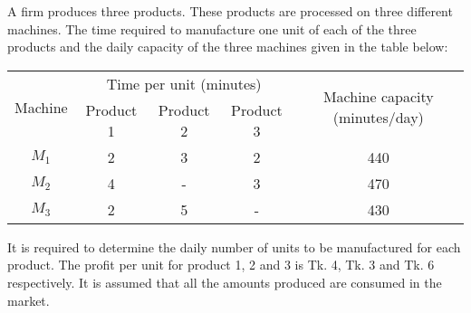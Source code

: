 \documentclass[../main-sheet.tex]{subfiles}
\begin{document}
\begin{ex}
    A firm produces three products. These products are processed on three different machines. The time required to manufacture one unit of each of the three products and the daily capacity of the three machines given in the table below:
    \begin{table}[H]
        \centering
        \begin{tabular}{ccccc}
            \toprule
            \multirow{2}{*}{Machine} & \multicolumn{3}{c}{Time per unit (minutes)} & \multirow{2}{*}{Machine capacity (minutes/day)}                   \\ \cmidrule(lr){2-4}
                                     & Product 1                                    & Product 2                                        & Product 3 &     \\ \midrule
            \(M_1\)                  & 2                                            & 3                                                & 2         & 440 \\
            \(M_2\)                  & 4                                            & -                                                & 3         & 470 \\
            \(M_3\)                  & 2                                            & 5                                                & -         & 430 \\ \bottomrule
        \end{tabular}
    \end{table}
    It is required to determine the daily number of units to be manufactured for each product. The profit per unit for product 1, 2 and 3 is Tk. 4, Tk. 3 and Tk. 6 respectively. It is assumed that all the amounts produced are consumed in the market.\\


\end{ex}
\end{document}
